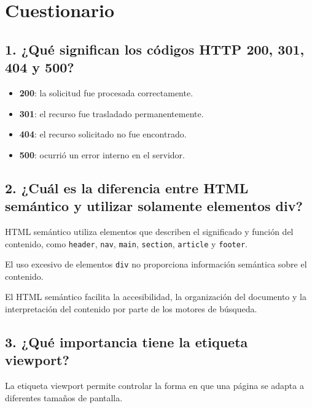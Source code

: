 \documentclass{article}
\begin{document}
\section{Cuestionario}

\subsection{1. ¿Qué significan los códigos HTTP 200, 301,
404 y 500?}

\begin{itemize}

    \item \textbf{200}: la solicitud fue procesada correctamente.

    \item \textbf{301}: el recurso fue trasladado permanentemente.

    \item \textbf{404}: el recurso solicitado no fue encontrado.

    \item \textbf{500}: ocurrió un error interno en el servidor.

\end{itemize}

\subsection{2. ¿Cuál es la diferencia entre HTML semántico
y utilizar solamente elementos div?}

HTML semántico utiliza elementos que describen el significado
y función del contenido, como \texttt{header}, \texttt{nav},
\texttt{main}, \texttt{section}, \texttt{article} y
\texttt{footer}.

El uso excesivo de elementos \texttt{div} no proporciona
información semántica sobre el contenido.

El HTML semántico facilita la accesibilidad, la organización
del documento y la interpretación del contenido por parte de
los motores de búsqueda.

\subsection{3. ¿Qué importancia tiene la etiqueta viewport?}

La etiqueta viewport permite controlar la forma en que una
página se adapta a diferentes tamaños de pantalla.
\end{document}
